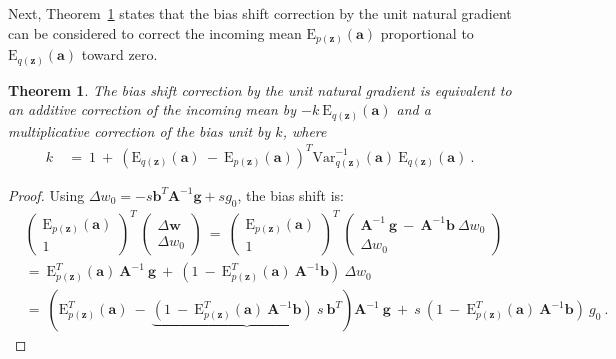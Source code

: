 \documentclass{article}
\newtheorem{theorem}{Theorem}
\newcommand\Ba{\bm{a}}
\newcommand\Bb{\bm{b}}
\newcommand\Bg{\bm{g}}
\newcommand\Bw{\bm{w}}
\newcommand\Bz{\bm{z}}
\newcommand\BA{\bm{A}}
\newcommand\EXP{\mathbf{\mathrm{E}}}
\newcommand\VAR{\mathbf{\mathrm{Var}}}
\begin{document}
Next, Theorem~\ref{th:th2} states that the bias shift correction by the
unit natural gradient can be
considered to correct the incoming mean $\EXP_{p(\Bz)} (\Ba)$ proportional
to $\EXP_{q(\Bz)} (\Ba)$ toward zero.
\begin{theorem}
\label{th:th2}
The bias shift correction by the unit natural gradient is equivalent to
an additive correction of the incoming mean by
$- k \ \EXP_{q(\Bz)} (\Ba)$
and a multiplicative correction of the bias unit by $k$, where
\begin{align}
\label{eq:k}
k \ &= \ 1 \ + \  \left( \EXP_{q(\Bz)}(\Ba) \ - \ \EXP_{p(\Bz)}(\Ba) \right)^T
\VAR_{q(\Bz)}^{-1}(\Ba) \ \EXP_{q(\Bz)}(\Ba) \ .
\end{align}
\end{theorem}
\begin{proof}
Using
$\Delta w_0 = - s \Bb^T \BA^{-1} \Bg + s g_0$, the bias shift is:
\begin{align}
&\begin{pmatrix}
\EXP_{p(\Bz)} (\Ba) \\
1
\end{pmatrix}^T \
\begin{pmatrix}
\Delta \Bw \\
\Delta w_0
\end{pmatrix}
\ = \
\begin{pmatrix}
\EXP_{p(\Bz)} (\Ba) \\
1
\end{pmatrix}^T \
\begin{pmatrix}
\BA^{-1} \ \Bg \ - \  \BA^{-1} \Bb  \ \Delta w_0\\
\Delta w_0
\end{pmatrix}  \\ \nonumber
&= \ \EXP_{p(\Bz)}^T (\Ba) \ \BA^{-1} \ \Bg \ + \
\left( 1 \ - \ \EXP_{p(\Bz)}^T (\Ba) \ \BA^{-1} \Bb \right) \
\Delta w_0  \\ \nonumber
&= \ \left( \EXP_{p(\Bz)}^T (\Ba) \ - \
\underbrace{\left( 1 \ - \ \EXP_{p(\Bz)}^T (\Ba) \ \BA^{-1} \Bb \right) \ s \
\Bb^T } \right) \BA^{-1} \ \Bg \ + \  s \ \left( 1 \ - \
\EXP_{p(\Bz)}^T (\Ba) \ \BA^{-1} \Bb \right) \ g_0 \ .
\end{align}


\end{proof}
\end{document}
